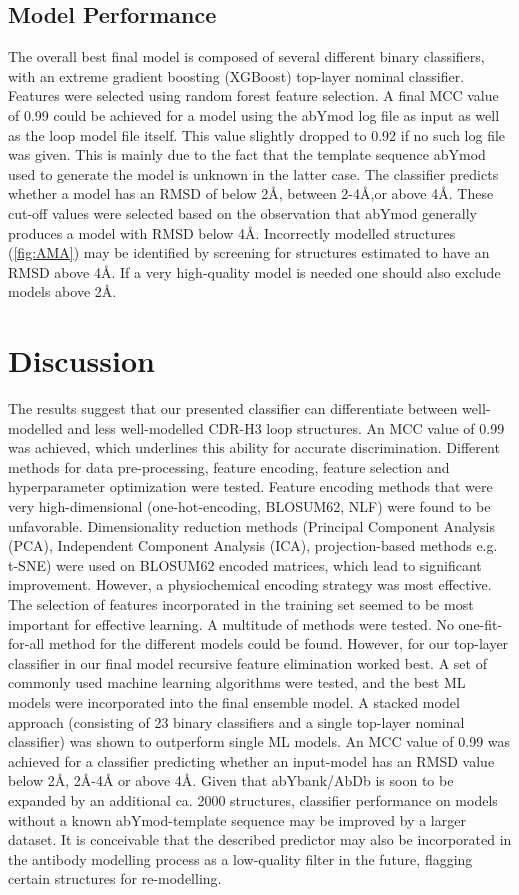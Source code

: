 \documentclass[preprint,12pt]{elsarticle}
\begin{document}
\subsection{Model Performance}
\label{sec:sample2}
The overall best final model is composed of several different binary classifiers, with an extreme gradient boosting (XGBoost) top-layer nominal classifier. Features were selected using random forest feature selection. A final MCC value of 0.99 could be achieved for a model using the abYmod log file as input as well as the loop model file itself. This value slightly dropped to 0.92 if no such log file was given. This is mainly due to the fact that the template sequence abYmod used to generate the model is unknown in the latter case. 
The classifier predicts whether a model has an RMSD of below 2Å, between 2-4Å,or above 4Å. These cut-off values were selected based on the observation that abYmod generally produces a model with RMSD below 4Å. Incorrectly modelled structures (\ref{fig:AMA}) may be identified by screening for structures estimated to have an RMSD above 4Å. If a very high-quality model is needed one should also exclude models above 2Å. 

\section{Discussion}
The results suggest that our presented classifier can differentiate between well-modelled and less well-modelled CDR-H3 loop structures. An MCC value of 0.99 was achieved, which underlines this ability for accurate discrimination. Different methods for data pre-processing, feature encoding, feature selection and hyperparameter optimization were tested. 
Feature encoding methods that were very high-dimensional (one-hot-encoding, BLOSUM62, NLF) were found to be unfavorable. Dimensionality reduction methods (Principal Component Analysis (PCA), Independent Component Analysis (ICA), projection-based methods e.g. t-SNE) were used on BLOSUM62 encoded matrices, which lead to significant improvement. However, a physiochemical encoding strategy was most effective. 
The selection of features incorporated in the training set seemed to be most important for effective learning. A multitude of methods were tested. No one-fit-for-all method for the different models could be found. However, for our top-layer classifier in our final model recursive feature elimination worked best. 
A set of commonly used machine learning algorithms were tested, and the best ML models were incorporated into the final ensemble model. A stacked model approach (consisting of 23 binary classifiers and a single top-layer nominal classifier) was shown to outperform single ML models.
An MCC value of 0.99 was achieved for a classifier predicting whether an input-model has an RMSD value below 2Å, 2Å-4Å or above 4Å. 
Given that abYbank/AbDb is soon to be expanded by an additional ca. 2000 structures, classifier performance on models without a known abYmod-template sequence may be improved by a larger dataset. 
It is conceivable that the described predictor may also be incorporated in the antibody modelling process as a low-quality filter in the future, flagging certain structures for re-modelling. 
\end{document}
